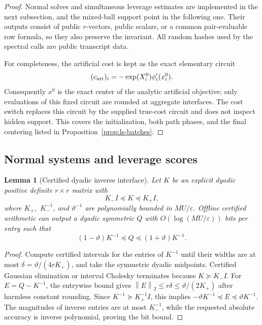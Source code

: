 \documentclass[11pt]{article}
\newtheorem{lemma}[theorem]{Lemma}
\theoremstyle{definition}
\newcommand{\eps}{\varepsilon}
\newcommand{\norm}[1]{\left\lVert #1\right\rVert}
\begin{document}
\begin{proof}
Normal solves and simultaneous leverage estimates are implemented in the
next subsection, and the mixed-ball support point in the following one.  Their
outputs consist of public $r$-vectors, public scalars, or a common
pair-evaluable row formula, so they also preserve the invariant.  All random
hashes used by the spectral calls are public transcript data.

For completeness, the artificial cost is kept as the exact elementary
circuit
\[
        (c_{\rm art})_i=-\exp(X_i^0)\phi_i'(x_i^0).
\]
Consequently $x^0$ is the exact center of the analytic artificial objective;
only evaluations of this fixed circuit are rounded at aggregate interfaces.
The cost switch replaces this circuit by the supplied true-cost circuit and
does not inspect hidden support.  This covers the initialization, both path
phases, and the final centering listed in
Proposition~\ref{prop:ls-batches}.
\end{proof}

\subsection{Normal systems and leverage scores}

\begin{lemma}[Certified dyadic inverse interface]
\label{lem:dyadic-inverse}
Let $K$ be an explicit dyadic positive definite $r\times r$ matrix with
\[
        K_-I\preceq K\preceq K_+I,
\]
where $K_+,$ $K_-^{-1}$, and $\vartheta^{-1}$ are polynomially bounded in
$MU/\eps$.  Offline certified arithmetic can output a dyadic symmetric $Q$
with $O(\log(MU/\eps))$ bits per entry such that
\[
 (1-\vartheta)K^{-1}\preceq Q
 \preceq(1+\vartheta)K^{-1}.
\]
\end{lemma}

\begin{proof}
Compute certified intervals for the entries of $K^{-1}$ until their widths
are at most
$\delta=\vartheta/(4rK_+) $, and take the symmetric dyadic midpoints.
Certified Gaussian elimination or interval Cholesky terminates because
$K\succeq K_-I$.  For $E=Q-K^{-1}$, the entrywise bound gives
$\norm E_2\le r\delta\le\vartheta/(2K_+)$ after harmless constant
rounding.  Since $K^{-1}\succeq K_+^{-1}I$, this implies
$-\vartheta K^{-1}\preceq E\preceq\vartheta K^{-1}$.
The magnitudes of inverse entries are at most $K_-^{-1}$, while the requested
absolute accuracy is inverse polynomial, proving the bit bound.
\end{proof}
\end{document}
